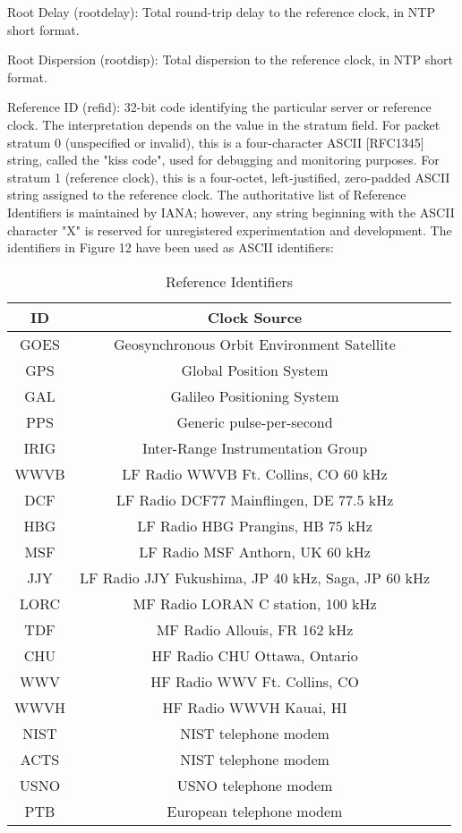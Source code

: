 Root Delay (rootdelay): Total round-trip delay to the reference
clock, in NTP short format.

Root Dispersion (rootdisp): Total dispersion to the reference clock,
in NTP short format.

Reference ID (refid): 32-bit code identifying the particular server
or reference clock. The interpretation depends on the value in the
stratum field. For packet stratum 0 (unspecified or invalid), this
is a four-character ASCII [RFC1345] string, called the "kiss code",
used for debugging and monitoring purposes. For stratum 1 (reference
clock), this is a four-octet, left-justified, zero-padded ASCII
string assigned to the reference clock. The authoritative list of
Reference Identifiers is maintained by IANA; however, any string
beginning with the ASCII character "X" is reserved for unregistered
experimentation and development. The identifiers in Figure 12 have
been used as ASCII identifiers:

\begin{table}[htb]
\center
\begin{tabular}{c | c | c}
ID & Clock Source \\
\hline
\hline
GOES & Geosynchronous Orbit Environment Satellite \\
GPS & Global Position System \\
GAL & Galileo Positioning System \\
PPS & Generic pulse-per-second \\
IRIG & Inter-Range Instrumentation Group \\
WWVB & LF Radio WWVB Ft. Collins, CO 60 kHz \\
DCF & LF Radio DCF77 Mainflingen, DE 77.5 kHz \\
HBG & LF Radio HBG Prangins, HB 75 kHz \\
MSF & LF Radio MSF Anthorn, UK 60 kHz \\
JJY & LF Radio JJY Fukushima, JP 40 kHz, Saga, JP 60 kHz \\
LORC & MF Radio LORAN C station, 100 kHz \\
TDF & MF Radio Allouis, FR 162 kHz \\
CHU & HF Radio CHU Ottawa, Ontario \\
WWV & HF Radio WWV Ft. Collins, CO \\
WWVH & HF Radio WWVH Kauai, HI \\
NIST & NIST telephone modem \\
ACTS & NIST telephone modem \\
USNO & USNO telephone modem \\
PTB & European telephone modem \\
\hline
\end{tabular}
\label{reference_identifiers}
\caption{Reference Identifiers}
\end{table}

